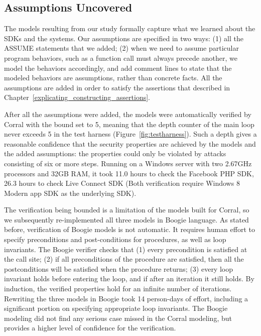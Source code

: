 \subsection{Assumptions Uncovered}

The models resulting from our study formally capture what we learned about the SDKs and the systems. Our assumptions are specified in two ways: (1) all the ASSUME statements that we added; (2) when we need to assume particular program behaviors, such as a function call must always precede another, we model the behaviors accordingly, and add comment lines to state that the modeled behaviors are assumptions, rather than concrete facts.  All the assumptions are added in order to satisfy the assertions that described in Chapter~\ref{explicating_constructing_assertions}.

  After all the assumptions were added, the models were automatically verified by Corral with the bound set to 5, meaning that the depth counter of the main loop never exceeds 5 in the test harness (Figure~\ref{fig:testharness}).  Such a depth gives a reasonable confidence that the security properties are achieved by the models and the added assumptions: the properties could only be violated by attacks consisting of six or more steps. Running on a Windows server with two 2.67GHz processors and 32GB RAM, it took 11.0 hours to check the Facebook PHP SDK, 26.3 hours to check Live Connect SDK (Both verification require Windows 8 Modern app SDK as the underlying SDK).

  The verification being bounded is a limitation of the models built for Corral, so we subsequently re-implemented all three models in Boogie language.  As stated before, verification of Boogie models is not automatic.  It requires human effort to specify preconditions and post-conditions for procedures, as well as loop invariants.  The Boogie verifier checks that (1) every precondition is satisfied at the call site; (2) if all preconditions of the procedure are satisfied, then all the postconditions will be satisfied when the procedure returns; (3) every loop invariant holds before entering the loop, and if after an iteration it still holds.  By induction, the verified properties hold for an infinite number of iterations. Rewriting the three models in Boogie took 14 person-days of effort, including a significant portion on specifying appropriate loop invariants.  The Boogie modeling did not find any serious case missed in the Corral modeling, but provides a higher level of confidence for the verification.

